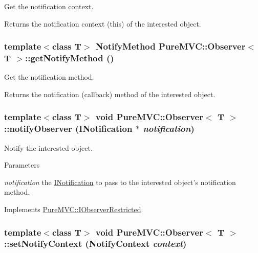 Get the notification context. \begin{DoxyReturn}{Returns}
the notification context ({\ttfamily this}) of the interested object. 
\end{DoxyReturn}
\hypertarget{class_pure_m_v_c_1_1_observer_a758265dc2431974f8deb4019b330bc64}{
\subsubsection[{getNotifyMethod}]{\setlength{\rightskip}{0pt plus 5cm}template$<$class T$>$ NotifyMethod {\bf PureMVC::Observer}$<$ T $>$::getNotifyMethod ()}}
\label{class_pure_m_v_c_1_1_observer_a758265dc2431974f8deb4019b330bc64}


Get the notification method. \begin{DoxyReturn}{Returns}
the notification (callback) method of the interested object. 
\end{DoxyReturn}
\hypertarget{class_pure_m_v_c_1_1_observer_a79996aa1a9b0d7e03c333ec177df74f1}{
\subsubsection[{notifyObserver}]{\setlength{\rightskip}{0pt plus 5cm}template$<$class T$>$ void {\bf PureMVC::Observer}$<$ T $>$::notifyObserver ({\bf INotification} $\ast$ {\em notification})}}
\label{class_pure_m_v_c_1_1_observer_a79996aa1a9b0d7e03c333ec177df74f1}


Notify the interested object. 
\begin{DoxyParams}{Parameters}
\item[{\em notification}]the {\ttfamily \hyperlink{class_pure_m_v_c_1_1_i_notification}{INotification}} to pass to the interested object's notification method. \end{DoxyParams}


Implements \hyperlink{class_pure_m_v_c_1_1_i_observer_restricted_a808a9378a31b068f285fe0b4446048e1}{PureMVC::IObserverRestricted}.\hypertarget{class_pure_m_v_c_1_1_observer_a832268c15c727dd0ba0b31fc5bf91308}{
\subsubsection[{setNotifyContext}]{\setlength{\rightskip}{0pt plus 5cm}template$<$class T$>$ void {\bf PureMVC::Observer}$<$ T $>$::setNotifyContext (NotifyContext {\em context})}}
\label{class_pure_m_v_c_1_1_observer_a832268c15c727dd0ba0b31fc5bf91308}



